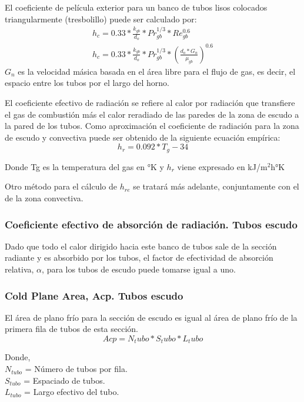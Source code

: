 \par El coeficiente de película exterior para un banco de tubos lisos colocados triangularmente (tresbolillo) puede ser calculado por:
\begin{equation}
\label{eq:hc}
\begin{gathered}
h_c = 0.33 * \frac{k_{gb}}{d_o} *Pr_{gb}^{1/3} *Re_{gb}^{0.6}\\
h_c = 0.33 * \frac{k_{gb}}{d_o} *Pr_{gb}^{1/3} *(\frac{d_o*G_n}{\mu_{gb}})^{0.6}
\end{gathered}
\end{equation}
$G_n$ es la velocidad másica basada en el área libre para el flujo de gas, es decir, el espacio entre los tubos por el largo del horno.

\par El coeficiente efectivo de radiación se refiere al calor por radiación que transfiere el gas de combustión más el calor reradiado de las paredes de la zona de escudo a la pared de los tubos. Como aproximación el coeficiente de radiación para la zona de escudo y convectiva puede ser obtenido de la siguiente ecuación empírica:
\begin{equation}
\label{eq:hr}
h_r = 0.092*T_g - 34  
\end{equation}
\par Donde Tg es la temperatura del gas en °K y $h_r$ viene expresado en kJ/m$^2$h°K

\par Otro método para el cálculo de $h_{re}$ se tratará más adelante, conjuntamente con el de la zona convectiva.

\subsubsection{Coeficiente efectivo de absorción de radiación. Tubos escudo}
\par Dado que todo el calor dirigido hacia este banco de tubos sale de la sección radiante y es absorbido por los tubos, el factor de efectividad de absorción relativa, $\alpha$, para los tubos de escudo puede tomarse igual a uno.

\subsubsection{Cold Plane Area, Acp. Tubos escudo}
\par El área de plano frío para la sección de escudo es igual al área de plano frío de la primera fila de tubos de esta sección.
\begin{equation*}
Acp = N_tubo * S_tubo * L_tubo
\end{equation*}
\par Donde, \\
$N_{tubo}$ = Número de tubos por fila. \\
$S_{tubo}$ = Espaciado de tubos. \\
$L_{tubo}$ = Largo efectivo del tubo.\\

